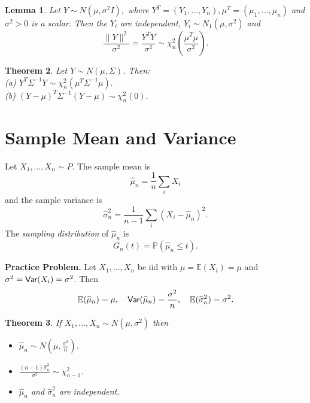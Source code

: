 \documentclass[twoside,12pt]{article}
\newcounter{lecnum}
\newtheorem{theorem}{Theorem}[lecnum]
\newtheorem{lemma}[theorem]{Lemma}
\begin{document}
\begin{lemma}
Let $Y \sim N(\mu, \sigma^2 I),$
where $Y^{T} = 
(Y_1, \ldots, Y_n), \mu^{T}=(\mu_1, \ldots, \mu_n)$ and
$\sigma^2>0$ is a scalar.  Then the $Y_i$ are independent, $Y_i \sim
N_1(\mu, \sigma^2)$ and 
$$
\frac{\|Y\|^2}{\sigma^2} = \frac{Y^T Y}{\sigma^2} \sim \chi^2_n 
\left(\frac{\mu^{T}\mu}{\sigma^2}\right).
$$
\end{lemma}




\begin{theorem}
Let $Y \sim N(\mu, \Sigma)$.
Then:\\
(a)  $Y^{T}\Sigma^{-1}Y \sim
\chi^2_n(\mu^{T}\Sigma^{-1}\mu).$\\
(b)  $(Y-\mu)^{T}\Sigma^{-1}(Y-\mu)\sim \chi^2_n(0).$
\end{theorem}






\section{Sample Mean and Variance}

Let $X_1,\ldots, X_n \sim P$.
The sample mean is 
$$
\widehat{\mu}_n = \frac{1}{n}\sum_i X_i
$$
and the sample variance is 
$$
\widehat{\sigma}^2_n= \frac{1}{n-1} \sum_i (X_i- \widehat{\mu}_n)^2.
$$
The {\em sampling distribution} of $\widehat{\mu}_n$ is
$$
G_n(t) = \mathbb{P}(\widehat{\mu}_n \leq t).
$$

{\bf Practice Problem.}
Let $X_1,\ldots, X_n$ be iid with
$\mu = \mathbb{E}(X_i)=\mu$ and
$\sigma^2 = {\sf Var}(X_i)=\sigma^2$.
Then
$$
\mathbb{E}(\widehat{\mu}_n) = \mu,\ \ \ 
{\sf Var}(\widehat{\mu}_n) = \frac{\sigma^2}{n},\ \ \ 
\mathbb{E}(\widehat{\sigma}_n^2) = \sigma^2.
$$



\begin{theorem}
If
$X_1,\dots,X_n \sim N(\mu,\sigma^2)$
then 
\begin{itemize}
\item [(a)]  $\widehat{\mu}_n \sim N(\mu,\frac{\sigma^2}{n})$.
\item [(b)]  $\frac{(n-1) \widehat{\sigma}_n^2}{\sigma^2} \sim \chi_{n-1}^2$.
\item [(c)]  $\widehat{\mu}_n$ and $\widehat{\sigma}_n^2$ are independent.
\end{itemize}
\end{theorem}
\end{document}
